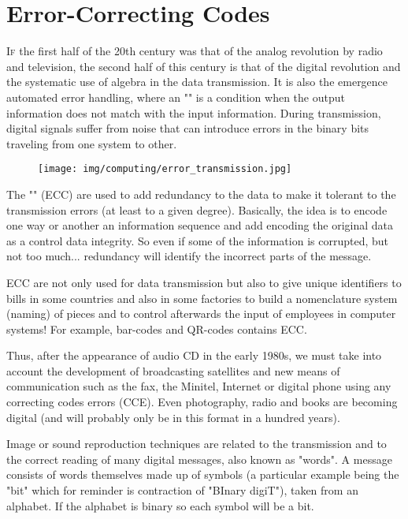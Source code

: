 	\section{Error-Correcting Codes}
	\lettrine[lines=4]{\color{BrickRed}I}f the first half of the 20th century was that of the analog revolution by radio and television, the second half of this century is that of the digital revolution and the systematic use of algebra in the data transmission. It is also the emergence automated error handling, where an "" is a condition when the output information does not match with the input information. During transmission, digital signals suffer from noise that can introduce errors in the binary bits traveling from one system to other. \\
	\begin{figure}[H]
		\centering
		\texttt{[image: img/computing/error\_transmission.jpg]}
	\end{figure}
	The "" (ECC) are used to add redundancy to the data to make it tolerant to the transmission errors (at least to a given degree). Basically, the idea is to encode one way or another an information sequence and add encoding the original data as a control data integrity. So even if some of the information is corrupted, but not too much... redundancy will identify the incorrect parts of the message.
	
	\begin{tcolorbox}[title=Remark,colframe=black,arc=10pt]
	ECC are not only used for data transmission but also to give unique identifiers to bills in some countries and also in some factories to build a nomenclature system (naming) of pieces and to control afterwards the input of employees in computer systems! For example, bar-codes and QR-codes contains ECC.
	\end{tcolorbox}
	
	Thus, after the appearance of audio CD in the early 1980s, we must take into account the development of broadcasting satellites  and new means of communication such as the fax, the Minitel, Internet or digital phone using any correcting codes errors (CCE). Even photography, radio and books are becoming digital (and will probably only be in this format in a hundred years).
	
	Image or sound reproduction techniques are related to the transmission and to the correct reading of many digital messages, also known as "words". A message consists of words themselves made up of symbols (a particular example being the "bit" which for reminder is contraction of "BInary digiT"), taken from an alphabet. If the alphabet is binary so each symbol will be a bit.
	
